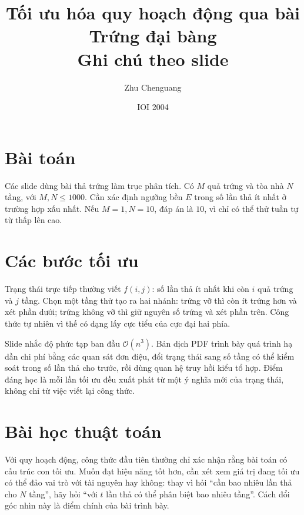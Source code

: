 \documentclass[11pt]{article}
\title{Tối ưu hóa quy hoạch động qua bài Trứng đại bàng\\{\large Ghi chú theo slide}}
\author{Zhu Chenguang}
\date{IOI 2004}
\newcommand{\Oh}{\mathcal{O}}
\begin{document}
\maketitle


\section{Bài toán}

Các slide dùng bài thả trứng làm trục phân tích. Có \(M\) quả trứng và tòa
nhà \(N\) tầng, với \(M,N\le 1000\). Cần xác định ngưỡng bền \(E\) trong số
lần thả ít nhất ở trường hợp xấu nhất. Nếu \(M=1,N=10\), đáp án là \(10\),
vì chỉ có thể thử tuần tự từ thấp lên cao.

\section{Các bước tối ưu}

Trạng thái trực tiếp thường viết \(f(i,j)\): số lần thả ít nhất khi còn
\(i\) quả trứng và \(j\) tầng. Chọn một tầng thử tạo ra hai nhánh: trứng vỡ
thì còn ít trứng hơn và xét phần dưới; trứng không vỡ thì giữ nguyên số trứng
và xét phần trên. Công thức tự nhiên vì thế có dạng lấy cực tiểu của cực đại
hai phía.

Slide nhắc độ phức tạp ban đầu \(\Oh(n^3)\). Bản dịch PDF trình bày quá
trình hạ dần chi phí bằng các quan sát đơn điệu, đổi trạng thái sang số tầng
có thể kiểm soát trong số lần thả cho trước, rồi dùng quan hệ truy hồi
kiểu tổ hợp. Điểm đáng học là mỗi lần tối ưu đều xuất phát từ một ý nghĩa mới
của trạng thái, không chỉ từ việc viết lại công thức.

\section{Bài học thuật toán}

Với quy hoạch động, công thức đầu tiên thường chỉ xác nhận rằng bài toán có
cấu trúc con tối ưu. Muốn đạt hiệu năng tốt hơn, cần xét xem giá trị đang tối
ưu có thể đảo vai trò với tài nguyên hay không: thay vì hỏi ``cần bao nhiêu
lần thả cho \(N\) tầng'', hãy hỏi ``với \(t\) lần thả có thể phân biệt bao
nhiêu tầng''. Cách đổi góc nhìn này là điểm chính của bài trình bày.
\end{document}
